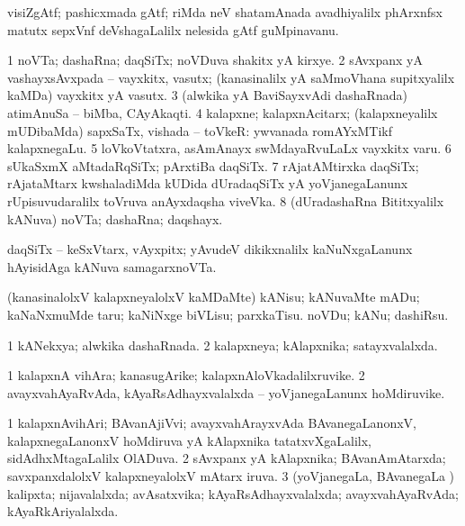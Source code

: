 \bentry 
{} 
\gl{\nA}
\expl{}
\bmng
 visiZgAtf; pashicxmada gAtf; riMda neV shatamAnada avadhiyalilx phArxnfsx matutx sepxVnf deVshagaLalilx nelesida gAtf guMpinavanu. 
\emng
\eentry

\bentry 
{} 
\gl{\nA}
\expl{}
\bmng
\bnum
\num{1} noVTa; dashaRna; daqSiTx; noVDuva shakitx yA kirxye. 
\num{2} sAvxpanx yA vashayxsAvxpada -- vayxkitx, vasutx; (kanasinalilx yA saMmoVhana supitxyalilx kaMDa) vayxkitx yA vasutx. 
\num{3} (alwkika yA BaviSayxvAdi dashaRnada) atimAnuSa -- biMba, CAyAkaqti. 
\num{4} kalapxne; kalapxnAcitarx; (kalapxneyalilx mUDibaMda) sapxSaTx, vishada -- toVkeR:  ywvanada romAYxMTikf kalapxnegaLu. 
\num{5} loVkoVtatxra, asAmAnayx swMdayaRvuLaLx vayxkitx \mo varu. 
\num{6} sUkaSxmX aMtadaRqSiTx; pArxtiBa daqSiTx. 
\num{7} rAjatAMtirxka daqSiTx; rAjataMtarx kwshaladiMda kUDida dUradaqSiTx yA yoVjanegaLanunx rUpisuvudaralilx toVruva anAyxdaqsha viveVka. 
\num{8} (dUradashaRna Bititxyalilx kANuva) noVTa; dashaRna; daqshayx. 
\enum
\emng

\noindent 
\gl{\pagu}
\expl{}
\bmng
  daqSiTx -- keSxVtarx, vAyxpitx; yAvudeV dikikxnalilx kaNuNxgaLanunx hAyisidAga kANuva samagarxnoVTa. 
\emng
\eentry

\bentry 
{} 
\gl{\sakirx}
\expl{}
\bmng
 (kanasinalolxV kalapxneyalolxV kaMDaMte) 
\banum
{} kANisu; kANuvaMte mADu; kaNaNxmuMde taru; kaNiNxge biVLisu; parxkaTisu. 
 noVDu; kANu; dashiRsu. 
\eanum
\emng
\eentry

\bentry
{} 
\gl{\gu}
\expl{}
\bmng
\bnum
\num{1} kANekxya; alwkika dashaRnada. 
\num{2} kalapxneya; kAlapxnika; satayxvalalxda. 
\enum
\emng
\eentry

\bentry 
{} 
\gl{\nA}
\expl{}
\bmng
\bnum
\num{1} kalapxnA vihAra; kanasugArike; kalapxnAloVkadalilxruvike. 
\num{2} avayxvahAyaRvAda, kAyaRsAdhayxvalalxda -- yoVjanegaLanunx hoMdiruvike. 
\enum
\emng
\eentry

\bentry 
{} 
\gl{\gu}
\expl{}
\bmng
\bnum
\num{1} kalapxnAvihAri; BAvanAjiVvi; avayxvahArayxvAda BAvanegaLanonxV, kalapxnegaLanonxV hoMdiruva yA kAlapxnika tatatxvXgaLalilx, sidAdhxMtagaLalilx OlADuva. 
\num{2} sAvxpanx yA kAlapxnika; BAvanAmAtarxda; savxpanxdalolxV kalapxneyalolxV mAtarx iruva. 
\num{3} (yoVjanegaLa, BAvanegaLa \vi) kalipxta; nijavalalxda; avAsatxvika; kAyaRsAdhayxvalalxda; avayxvahAyaRvAda; kAyaRkAriyalalxda. 
\enum
\emng
\eentry

